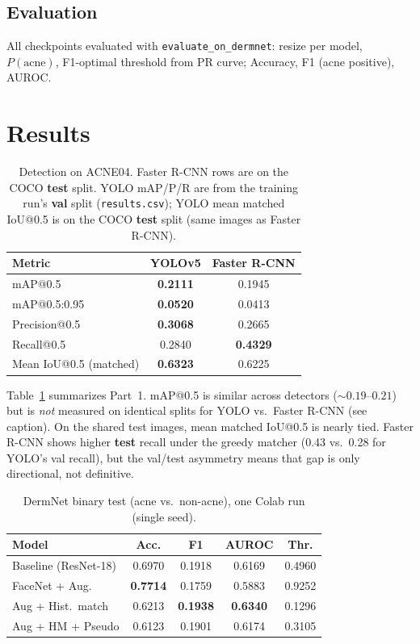 \documentclass[10pt,twocolumn]{article}
\begin{document}
\subsection{Evaluation}

All checkpoints evaluated with \texttt{evaluate\_on\_dermnet}: resize per model, $P(\text{acne})$, F1-optimal threshold from PR curve; Accuracy, F1 (acne positive), AUROC.

\section{Results}

\begin{table}[!t]
\centering
\scriptsize
\setlength{\tabcolsep}{4pt}
\begin{tabular}{@{}lcc@{}}
\toprule
Metric & YOLOv5 & Faster R-CNN \\
\midrule
mAP@0.5 & \textbf{0.2111} & 0.1945 \\
mAP@0.5:0.95 & \textbf{0.0520} & 0.0413 \\
Precision@0.5 & \textbf{0.3068} & 0.2665 \\
Recall@0.5 & 0.2840 & \textbf{0.4329} \\
Mean IoU@0.5 (matched) & \textbf{0.6323} & 0.6225 \\
\bottomrule
\end{tabular}
\caption{Detection on ACNE04. Faster R-CNN rows are on the COCO \textbf{test} split. YOLO mAP/P/R are from the training run's \textbf{val} split (\texttt{results.csv}); YOLO mean matched IoU@0.5 is on the COCO \textbf{test} split (same images as Faster R-CNN).}
\label{tab:det}
\end{table}

Table~\ref{tab:det} summarizes Part~1. mAP@0.5 is similar across detectors (${\sim}0.19$--$0.21$) but is \textit{not} measured on identical splits for YOLO vs.\ Faster R-CNN (see caption). On the shared test images, mean matched IoU@0.5 is nearly tied. Faster R-CNN shows higher \textbf{test} recall under the greedy matcher (0.43 vs.\ 0.28 for YOLO's val recall), but the val/test asymmetry means that gap is only directional, not definitive.

\begin{table}[!t]
\centering
\scriptsize
\setlength{\tabcolsep}{3pt}
\begin{tabular}{@{}lcccc@{}}
\toprule
Model & Acc. & F1 & AUROC & Thr. \\
\midrule
Baseline (ResNet-18) & 0.6970 & 0.1918 & 0.6169 & 0.4960 \\
FaceNet + Aug. & \textbf{0.7714} & 0.1759 & 0.5883 & 0.9252 \\
Aug + Hist.\ match & 0.6213 & \textbf{0.1938} & \textbf{0.6340} & 0.1296 \\
Aug + HM + Pseudo & 0.6123 & 0.1901 & 0.6174 & 0.3105 \\
\bottomrule
\end{tabular}
\caption{DermNet binary test (acne vs.\ non-acne), one Colab run (single seed).}
\label{tab:cls}
\end{table}
\end{document}
